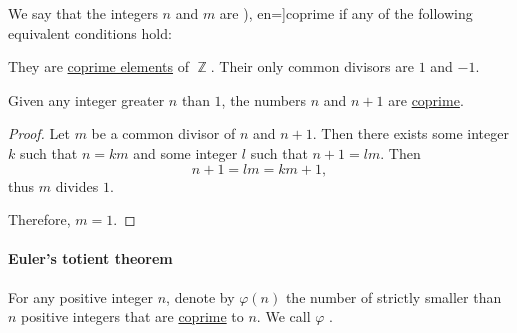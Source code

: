 \begin{definition}\label{def:coprime_numbers}
  We say that the integers \( n \) and \( m \) are \term[ru=взаимно простые (числа) (\cite[45]{Зорич2019Том1}), en=]{coprime} if any of the following equivalent conditions hold:
  \begin{thmenum}
     They are \hyperref[def:coprime_elements]{coprime elements} of \( \BbbZ \).
     Their only common divisors are \( 1 \) and \( -1 \).
  \end{thmenum}
\end{definition}

\begin{proposition}\label{thm:n_plus_1_coprime}
  Given any integer greater \( n \) than \( 1 \), the numbers \( n \) and \( n + 1 \) are \hyperref[def:coprime_elements]{coprime}.
\end{proposition}
\begin{proof}
  Let \( m \) be a common divisor of \( n \) and \( n + 1 \). Then there exists some integer \( k \) such that \( n = km \) and some integer \( l \) such that \( n + 1 = lm \). Then
  \begin{equation*}
    n + 1 = lm = km + 1,
  \end{equation*}
  thus \( m \) divides \( 1 \).

  Therefore, \( m = 1 \).
\end{proof}

\paragraph{Euler's totient theorem}\hfill

\begin{definition}\label{def:eulers_totient_function}
  For any positive integer \( n \), denote by \( \varphi(n) \) the number of strictly smaller than \( n \) positive integers that are \hyperref[def:coprime_elements]{coprime} to \( n \). We call \( \varphi \) .
\end{definition}

